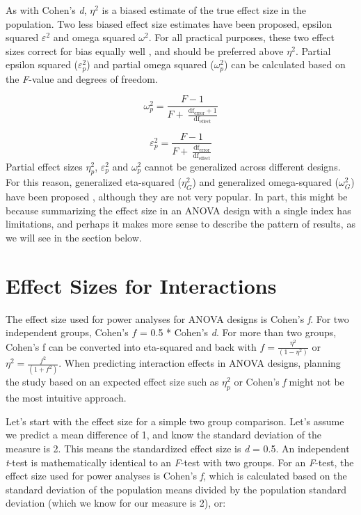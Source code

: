 \documentclass[
  oneside]{krantz}
\begin{document}
As with Cohen's \emph{d}, \(\eta^2\) is a biased estimate of the true effect size in the population. Two less biased effect size estimates have been proposed, epsilon squared \(\varepsilon^{2}\) and omega squared \(\omega^{2}\). For all practical purposes, these two effect sizes correct for bias equally well \citep{okada_is_2013, albers_when_2018}, and should be preferred above \(\eta^2\). Partial epsilon squared (\(\varepsilon_{p}^{2}\)) and partial omega squared (\(\omega_{p}^{2}\)) can be calculated based on the \emph{F}-value and degrees of freedom.

\[
\omega_{p}^{2} = \frac{F - 1}{F + \ \frac{\text{df}_{\text{error}} + 1}{\text{df}_{\text{effect}}}}
\]

\[
\varepsilon_{p}^{2} = \frac{F - 1}{F + \ \frac{\text{df}_{\text{error}}}{\text{df}_{\text{effect}}}}
\]
Partial effect sizes \(\eta_{p}^{2}\), \(\varepsilon_{p}^{2}\) and \(\omega_{p}^{2}\) cannot be generalized across different designs. For this reason, generalized eta-squared (\(\eta_{G}^{2}\)) and generalized omega-squared (\(\omega_{G}^{2}\)) have been proposed \citep{olejnik_generalized_2003}, although they are not very popular. In part, this might be because summarizing the effect size in an ANOVA design with a single index has limitations, and perhaps it makes more sense to describe the pattern of results, as we will see in the section below.

\hypertarget{effect-sizes-for-interactions}{%
\section{Effect Sizes for Interactions}\label{effect-sizes-for-interactions}}

The effect size used for power analyses for ANOVA designs is Cohen's \emph{f}. For two independent groups, Cohen's \(f\) = 0.5 * Cohen's \emph{d}. For more than two groups, Cohen's f can be converted into eta-squared and back with \(f = \frac{\eta^2}{(1 - \eta^2)}\) or \(\eta^2 = \frac{f^2}{(1 + f^2)}\). When predicting interaction effects in ANOVA designs, planning the study based on an expected effect size such as \(\eta_{p}^{2}\) or Cohen's \emph{f} might not be the most intuitive approach.

Let's start with the effect size for a simple two group comparison. Let's assume we predict a mean difference of 1, and know the standard deviation of the measure is 2. This means the standardized effect size is \emph{d} = 0.5. An independent \emph{t}-test is mathematically identical to an \emph{F}-test with two groups. For an \emph{F}-test, the effect size used for power analyses is Cohen's \emph{f}, which is calculated based on the standard deviation of the population means divided by the population standard deviation (which we know for our measure is 2), or:
\end{document}
